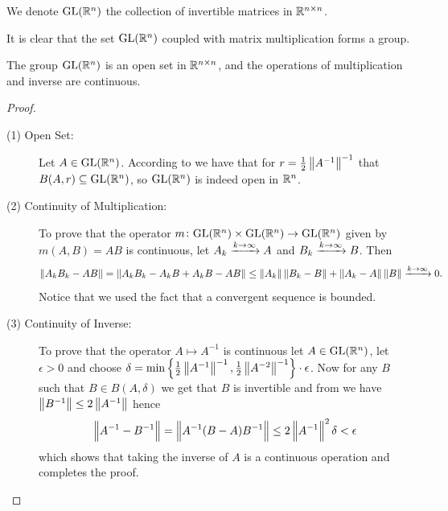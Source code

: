 \documentclass[11pt,a4paper]{article}
\begin{document}
\begin{definition}
  We denote $\mathrm{GL}(\mathbb{R}^n)$ the collection of invertible matrices in 
  $\mathbb{R}^{n \times n}$.
\end{definition}
\begin{remark}
  It is clear that the set $\mathrm{GL}(\mathbb{R}^n)$ coupled with matrix multiplication
  forms a group.
\end{remark}

\begin{proposition}
  The group $\mathrm{GL}(\mathbb{R}^n)$ is an open set in $\mathbb{R}^{n \times n}$, and the operations
  of multiplication and inverse are continuous.
\end{proposition}
\begin{proof} \phantom{}
\begin{description}
  \item[(1) Open Set:]
  Let $A \in \mathrm{GL}(\mathbb{R}^n)$.
  According to  we have that for 
  $r = \frac{1}{2} \left\lVert A^{-1}\right\rVert^{-1}$ that $B(A,r) \subseteq \mathrm{GL}(\mathbb{R}^n)$,
  so $\mathrm{GL}(\mathbb{R}^n)$ is indeed open in $\mathbb{R}^n$.
  \item[(2) Continuity of Multiplication:]
  To prove that the operator $m \colon \mathrm{GL}(\mathbb{R}^n) \times \mathrm{GL}(\mathbb{R}^n) \to \mathrm{GL}(\mathbb{R}^n)$
  given by $m(A,B) = AB$ is continuous, let $A_k \xrightarrow{k \to \infty} A$
  and $B_k \xrightarrow{k \to \infty} B$. Then
  \[
    \left\lVert A_k B_k - A B\right\rVert =
    \left\lVert A_k B_k - A_k B + A_k B - A B\right\rVert \le
    \left\lVert A_k\right\rVert \left\lVert B_k - B\right\rVert + \left\lVert A_k - A\right\rVert \left\lVert B\right\rVert \xrightarrow{k \to \infty}
    0.
  \]
  Notice that we used the fact that a convergent sequence is bounded.
  \item[(3) Continuity of Inverse:]
  To prove that the operator $A \mapsto A^{-1}$ is continuous
  let $A \in \mathrm{GL}(\mathbb{R}^n)$,
  let $\epsilon > 0$
  and choose
  $\delta = \min\left\{\frac{1}{2} \left\lVert A^{-1}\right\rVert^{-1},\frac{1}{2} \left\lVert A^{-2}\right\rVert^{-1}\right\} 
  \cdot \epsilon$.
  Now for any $B$ such that $B \in B(A,\delta)$ we get that $B$ is invertible
  and from  we have 
  $\left\lVert B^{-1}\right\rVert \le 2 \left\lVert A^{-1}\right\rVert$ hence
  \[
    \left\lVert A^{-1} - B^{-1}\right\rVert =
    \left\lVert A^{-1} (B - A) B^{-1}\right\rVert \le
    2 \left\lVert A^{-1}\right\rVert^2 \delta < \epsilon
  \]
  which shows that taking the inverse of $A$ is a continuous operation and
  completes the proof.
\end{description}
\end{proof}
\end{document}
